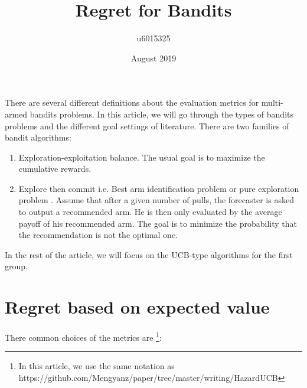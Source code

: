 \documentclass{article}
\title{Regret for Bandits}
\author{u6015325 }
\date{August 2019}
\begin{document}
\maketitle

There are several different definitions about the evaluation metrics for multi-armed bandits problems. In this article, we will go through the types of bandits problems and the different goal settings of literature. There are two families of bandit algorithms:

\begin{enumerate}
    \item Exploration-exploitation balance. The usual goal is to maximize the cumulative rewards.
    \item Explore then commit i.e. Best arm identification problem or pure exploration problem \cite{audibert2010best}. Assume that after a given number of pulls, the forecaster is asked to output a recommended arm. He is then only evaluated by the average payoff of his recommended arm. The goal is to minimize the probability that the recommendation is not the optimal one. 
\end{enumerate}

In the rest of the article, we will focus on the UCB-type algorithms for the first group. 

\section{Regret based on expected value}

There common choices of the metrics are \footnote{In this article, we use the same notation as https://github.com/Mengyanz/paper/tree/master/writing/HazardUCB}:
\end{document}
